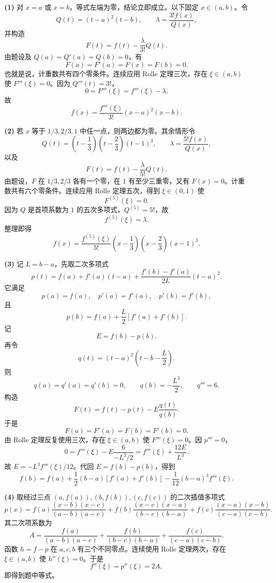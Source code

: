 \begin{xsolution}
\textbf{(1)}\quad
对 $x=a$ 或 $x=b$，等式左端为零，结论立即成立。以下固定 $x\in(a,b)$。令
\[
  Q(t)=(t-a)^2(t-b),
  \qquad
  \lambda=\frac{3!f(x)}{Q(x)},
\]
并构造
\[
  F(t)=f(t)-\frac{\lambda}{3!}Q(t).
\]
由题设及 $Q(a)=Q'(a)=Q(b)=0$，有
\[
  F(a)=F'(a)=F(x)=F(b)=0.
\]
也就是说，计重数共有四个零条件。连续应用 Rolle 定理三次，存在 $\xi\in(a,b)$ 使 $F'''(\xi)=0$。因为 $Q'''(t)=3!$，
\[
  0=F'''(\xi)=f'''(\xi)-\lambda.
\]
故
\[
  f(x)=\frac{f'''(\xi)}{3!}(x-a)^2(x-b).
\]

\textbf{(2)}\quad
若 $x$ 等于 $1/3,2/3,1$ 中任一点，则两边都为零。其余情形令
\[
  Q(t)=\left(t-\frac13\right)
       \left(t-\frac23\right)(t-1)^3,
  \qquad
  \lambda=\frac{5!f(x)}{Q(x)},
\]
以及
\[
  F(t)=f(t)-\frac{\lambda}{5!}Q(t).
\]
由题设，$F$ 在 $1/3,2/3$ 各有一个零，在 $1$ 有至少三重零，又有 $F(x)=0$。计重数共有六个零条件。连续应用 Rolle 定理五次，得到 $\xi\in(0,1)$ 使
\[
  F^{(5)}(\xi)=0.
\]
因为 $Q$ 是首项系数为 $1$ 的五次多项式，$Q^{(5)}=5!$，故
\[
  f^{(5)}(\xi)=\lambda.
\]
整理即得
\[
  f(x)=\frac{f^{(5)}(\xi)}{5!}
  \left(x-\frac13\right)
  \left(x-\frac23\right)(x-1)^3.
\]

\textbf{(3)}\quad
记 $L=b-a$，先取二次多项式
\[
  p(t)=f(a)+f'(a)(t-a)
  +\frac{f'(b)-f'(a)}{2L}(t-a)^2.
\]
它满足
\[
  p(a)=f(a),\quad p'(a)=f'(a),\quad p'(b)=f'(b),
\]
且
\[
  p(b)=f(a)+\frac L2[f'(a)+f'(b)].
\]
记
\[
  E=f(b)-p(b).
\]
再令
\[
  q(t)=(t-a)^2\left(t-b-\frac L2\right).
\]
则
\[
  q(a)=q'(a)=q'(b)=0,
  \qquad q(b)=-\frac{L^3}{2},
  \qquad q'''=6.
\]
构造
\[
  F(t)=f(t)-p(t)-E\frac{q(t)}{q(b)}.
\]
于是
\[
  F(a)=F'(a)=F(b)=F'(b)=0.
\]
由 Rolle 定理反复使用三次，存在 $\xi\in(a,b)$ 使 $F'''(\xi)=0$。因 $p'''=0$，
\[
  0=f'''(\xi)-E\frac{6}{-L^3/2}
  =f'''(\xi)+\frac{12E}{L^3}.
\]
故 $E=-L^3f'''(\xi)/12$。代回 $E=f(b)-p(b)$，得到
\[
  f(b)=f(a)+\frac12(b-a)[f'(a)+f'(b)]
  -\frac1{12}(b-a)^3f'''(\xi).
\]

\textbf{(4)}\quad
取经过三点 $(a,f(a)),(b,f(b)),(c,f(c))$ 的二次插值多项式
\[
  p(x)=f(a)\frac{(x-b)(x-c)}{(a-b)(a-c)}
  +f(b)\frac{(x-c)(x-a)}{(b-c)(b-a)}
  +f(c)\frac{(x-a)(x-b)}{(c-a)(c-b)}.
\]
其二次项系数为
\[
  A=\frac{f(a)}{(a-b)(a-c)}
   +\frac{f(b)}{(b-c)(b-a)}
   +\frac{f(c)}{(c-a)(c-b)}.
\]
函数 $h=f-p$ 在 $a,c,b$ 有三个不同零点。连续使用 Rolle 定理两次，存在 $\xi\in(a,b)$ 使 $h''(\xi)=0$。于是
\[
  f''(\xi)=p''(\xi)=2A,
\]
即得到题中等式。
\end{xsolution}


